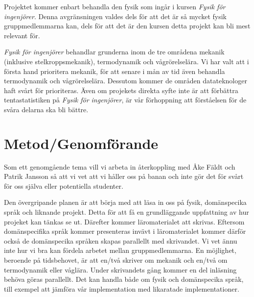 \documentclass[12pt,a4paper]{article}
\begin{document}
Projektet kommer enbart behandla den fysik som ingår i kursen \textit{Fysik för
ingenjörer}. Denna avgränsningen valdes dels för att det är så mycket fysik
gruppmedlemmarna kan, dels för att det är den kursen detta projekt kan bli mest
relevant för.

\textit{Fysik för ingenjörer} behandlar grunderna inom de tre områdena mekanik
(inklusive stelkroppsmekanik), termodynamik och vågrörelselära. Vi har valt att
i första hand prioritera mekanik, för att senare i mån av tid även behandla
termodynamik och vågrörelselära. Dessutom kommer de områden datateknologer haft
svårt för prioriteras. Även om projekets direkta syfte inte är att förbättra
tentastatistiken på \textit{Fysik för ingenjörer}, är vår förhoppning att
förståelsen för de svåra delarna ska bli bättre.




\section{Metod/Genomförande}

Som ett genomgående tema vill vi arbeta in återkoppling med Åke Fäldt och Patrik
Jansson så att vi vet att vi håller oss på banan och inte gör det för svårt för
oss själva eller potentiella studenter.

Den övergripande planen är att börja med att läsa in oss på fysik, domänspecika
språk och liknande projekt. Detta för att få en grundläggande uppfattning av hur
projeket kan tänkas se ut. Därefter kommer läromaterialet att skrivas. Eftersom
domänspecifika språk kommer presenteras invävt i läromaterialet kommer därför
också de domänspecika språken skapas parallellt med skrivandet. Vi vet ännu inte
hur vi bra kan fördela arbetet mellan gruppmedlemmarna. En möjlighet, beroende
på tidsbehovet, är att en/två skriver om mekanik och en/två om termodynamik
eller våglära. Under skrivandets gång kommer en del inläsning behöva göras
parallellt. Det kan handla både om fysik och domänspecika språk, till exempel
att jämföra vår implementation med likaratade implementationer.
\end{document}
